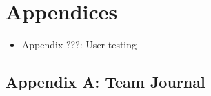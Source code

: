\newpage

\hypertarget{sec:appendices}{%
\section{Appendices}\label{sec:appendices}}

\begin{itemize}
\tightlist
\item
  Appendix ???: User testing
\end{itemize}

\hypertarget{appendix-a-team-journal}{%
\subsection{Appendix A: Team Journal}\label{appendix-a-team-journal}}
